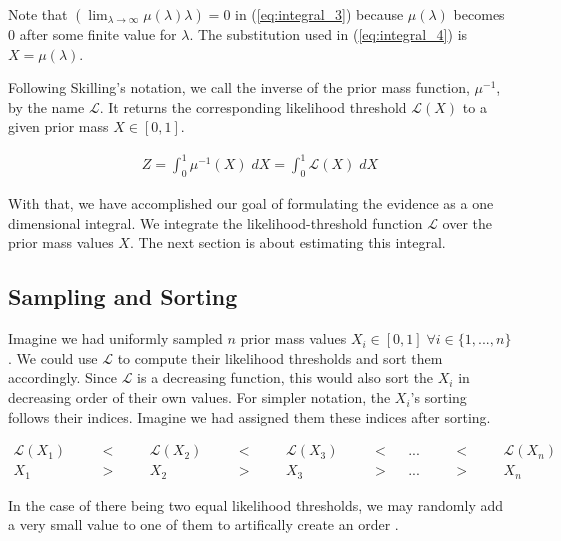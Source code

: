 \documentclass[12pt, a4paper]{report}
\begin{document}
Note that $\left(\lim_{\lambda \rightarrow \infty} \mu(\lambda) \lambda\right) = 0$ in (\ref{eq:integral_3}) because $\mu(\lambda)$ becomes $0$ after some finite value for $\lambda$.
The substitution used in (\ref{eq:integral_4}) is $X = \mu(\lambda)$.

Following Skilling's notation, we call the inverse of the prior mass function, $\mu^{-1}$, by the name $\mathcal{L}$.
It returns the corresponding likelihood threshold $\mathcal{L}(X)$ to a given prior mass $X \in [0,1]$.

\begin{align}
    Z = \int_0^1 \mu^{-1}(X) \; dX = \int_0^1 \mathcal{L}(X) \; dX
    \label{eq:integral_5}
\end{align}

With that, we have accomplished our goal of formulating the evidence as a one dimensional integral.
We integrate the likelihood-threshold function $\mathcal{L}$ over the prior mass values $X$.
The next section is about estimating this integral. 


\FloatBarrier
\subsection{Sampling and Sorting}

Imagine we had uniformly sampled $n$ prior mass values $X_i \in [0,1] \; \forall i \in \{1, ..., n\}$.
We could use $\mathcal{L}$ to compute their likelihood thresholds and sort them accordingly.
Since $\mathcal{L}$ is a decreasing function, this would also sort the $X_i$ in decreasing order of their own values.
For simpler notation, the $X_i$'s sorting follows their indices.
Imagine we had assigned them these indices after sorting.

\begin{align}
    \mathcal{L}(X_1)& &<& &\mathcal{L}(X_2)& &<& &\mathcal{L}(X_3) &\quad&<&   &...& &<& &\mathcal{L}(X_n) \nonumber\\
    X_1 & \quad &>& \quad &X_2 & \quad &>& \quad &X_3 &\quad&>& &...& \quad &>& \quad &X_n \label{eq:sample_ordering}
\end{align}

In the case of there being two equal likelihood thresholds, we may randomly add a very small value to one of them to artifically create an order \cite[3]{skilling}.
\end{document}
